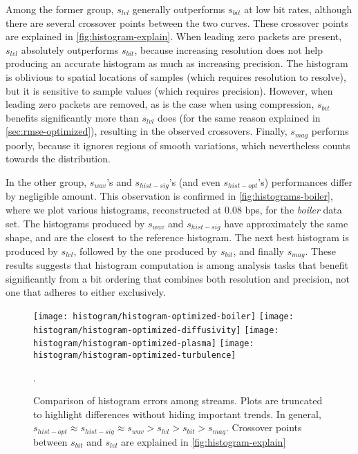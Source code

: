 Among the former group, $s_{lvl}$ generally outperforms $s_{bit}$ at low bit rates, although there
are several crossover points between the two curves. These crossover points are explained in
\cref{fig:histogram-explain}. When leading zero packets are present, $s_{lvl}$ absolutely
outperforms $s_{bit}$, because increasing resolution does not help producing an accurate histogram
as much as increasing precision. The histogram is oblivious to spatial locations of samples (which
requires resolution to resolve), but it is sensitive to sample values (which requires precision).
However, when leading zero packets are removed, as is the case when using compression, $s_{bit}$
benefits significantly more than $s_{lvl}$ does (for the same reason explained in
\cref{sec:rmse-optimized}), resulting in the observed crossovers. Finally, $s_{mag}$ performs
poorly, because it ignores regions of smooth variations, which nevertheless counts towards the
distribution.

In the other group, $s_{wav}$'s and $s_{hist-sig}$'s (and even $s_{hist-opt}$'s) performances
differ by negligible amount. This observation is confirmed in \cref{fig:histograms-boiler}, where
we plot various histograms, reconstructed at 0.08 bps, for the \emph{boiler} data set. The histograms
produced by $s_{wav}$ and $s_{hist-sig}$ have approximately the same shape, and are the closest to
the reference histogram. The next best histogram is produced by $s_{lvl}$, followed by the one
produced by $s_{bit}$, and finally $s_{mag}$. These results suggests that histogram computation is
among analysis tasks that benefit significantly from a bit ordering that combines both resolution
and precision, not one that adheres to either exclusively.

\begin{figure}[t]
	\centering
	{\texttt{[image: histogram/histogram-optimized-boiler]}}
	{\texttt{[image: histogram/histogram-optimized-diffusivity]}}
	{\texttt{[image: histogram/histogram-optimized-plasma]}}
	{\texttt{[image: histogram/histogram-optimized-turbulence]}}
	\caption{Comparison of histogram errors among streams. Plots are truncated to highlight
	differences without hiding important trends. In general, $s_{hist-opt}\approx s_{hist-sig}\approx
	s_{wav} > s_{lvl} > s_{bit} > s_{mag}$. Crossover points between $s_{bit}$ and $s_{lvl}$ are
	explained in \cref{fig:histogram-explain}}.
	\label{fig:histogram-stream-comparison}
\end{figure}

